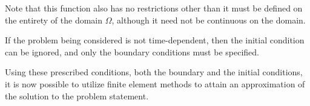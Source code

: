 \documentclass[../fem.tex]{subfile}
\begin{document}
Note that this function also has no restrictions other than it must be defined
on the entirety of the domain $\Omega$, although it need not be continuous on
the domain.

If the problem being considered is not time-dependent, then the initial
condition can be ignored, and only the boundary conditions must be specified.

Using these prescribed conditions, both the boundary and the initial
conditions, it is now possible to utilize finite element methods to attain an
approximation of the solution to the problem statement.
\end{document}
